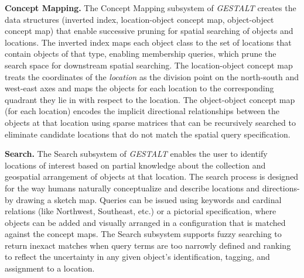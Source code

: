\textbf{Concept Mapping.}
The Concept Mapping subsystem of \emph{GESTALT} creates the data structures (inverted index, location-object concept map, object-object concept map) that enable successive pruning for spatial searching of objects and locations. 
The inverted index maps each object class to the set of locations that contain objects of that type, enabling membership queries, which prune the search space for downstream spatial searching. 
The location-object concept map treats the coordinates of the \textit{location} as the division point on the north-south and west-east axes and maps the objects for each location to the corresponding quadrant they lie in with respect to the location.
The object-object concept map (for each location) encodes the implicit directional relationships between the objects at that location using sparse matrices that can be recursively searched to eliminate candidate locations that do not match the spatial query specification. 

\textbf{Search.}
The Search subsystem of \emph{GESTALT} enables the user to identify locations of interest based on partial knowledge about the collection and geospatial arrangement of objects at that location. 
The search process is designed for the way humans naturally conceptualize and describe locations and directions- by drawing a sketch map.
Queries can be issued using keywords and cardinal relations (like Northwest, Southeast, etc.) or a pictorial specification, where objects can be added and visually arranged in a configuration that is matched against the concept maps.
The Search subsystem supports fuzzy searching to return inexact matches when query terms are too narrowly defined and ranking to reflect the uncertainty in any given object's identification, tagging, and assignment to a location.


